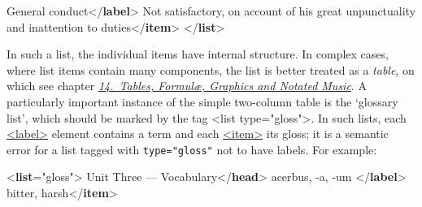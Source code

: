 \begin{shaded}
General conduct{</\textbf{label}>}\mbox{}\newline 
{}Not satisfactory, on account of his great\mbox{}\newline 
\hspace*{1em}\hspace*{1em} unpunctuality and inattention to duties{</\textbf{item}>}\mbox{}\newline 
{</\textbf{list}>}\end{shaded}\egroup\par \par
In such a list, the individual items have internal structure. In complex cases, where list items contain many components, the list is better treated as a \textit{table},  on which see chapter \textit{\hyperref[FT]{14.\ Tables, Formulæ, Graphics and Notated Music}}. A particularly important instance of the simple two-column table is the ‘glossary list’, which should be marked by the tag <list type="gloss">. In such lists, each \hyperref[TEI.label]{<label>} element contains a term and each \hyperref[TEI.item]{<item>} its gloss; it is a semantic error for a list tagged with \texttt{type="gloss"} not to have labels. For example: \par\bgroup{}\exampleFont \begin{shaded}\noindent\mbox{}{<\textbf{list}\hspace*{1em}{type}="{gloss}">}\mbox{}\newline 
{}Unit Three — Vocabulary{</\textbf{head}>}\mbox{}\newline 
{}acerbus, -a, -um {</\textbf{label}>}\mbox{}\newline 
{}bitter, harsh{</\textbf{item}>}\mbox{}\newline 

\end{shaded}
